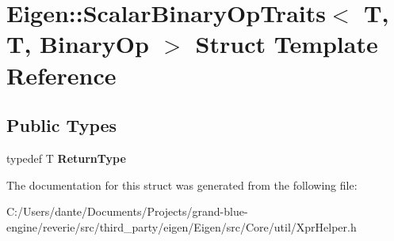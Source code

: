 \hypertarget{struct_eigen_1_1_scalar_binary_op_traits_3_01_t_00_01_t_00_01_binary_op_01_4}{}\section{Eigen\+::Scalar\+Binary\+Op\+Traits$<$ T, T, Binary\+Op $>$ Struct Template Reference}
\label{struct_eigen_1_1_scalar_binary_op_traits_3_01_t_00_01_t_00_01_binary_op_01_4}
\subsection*{Public Types}
\begin{DoxyCompactItemize}
\item 
\mbox{\label{struct_eigen_1_1_scalar_binary_op_traits_3_01_t_00_01_t_00_01_binary_op_01_4_a3ddad9b7a6d73680e9bb6f541df70524}} 
typedef T {\bfseries Return\+Type}
\end{DoxyCompactItemize}


The documentation for this struct was generated from the following file\+:\begin{DoxyCompactItemize}
\item 
C\+:/\+Users/dante/\+Documents/\+Projects/grand-\/blue-\/engine/reverie/src/third\+\_\+party/eigen/\+Eigen/src/\+Core/util/Xpr\+Helper.\+h\end{DoxyCompactItemize}
